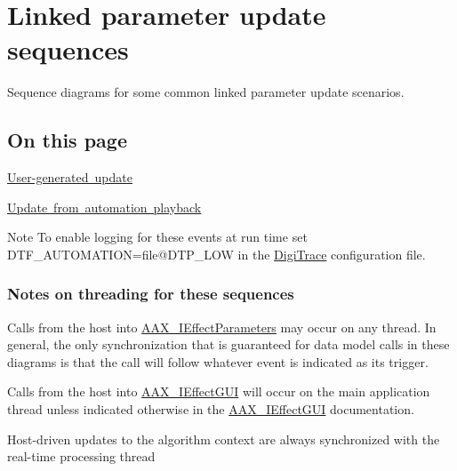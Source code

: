 \hypertarget{a00825}{}\section{Linked parameter update sequences}
\label{a00825}
Sequence diagrams for some common linked parameter update scenarios. 

\hypertarget{a00825_advancedTopics_linkedParameters_sequences_contents}{}\subsection{On this page}\label{a00825_advancedTopics_linkedParameters_sequences_contents}
\begin{DoxyItemize}
\item \mbox{\hyperlink{a00825_linkedParameters_sequences_user_gui}{User-\/generated update}} \item \mbox{\hyperlink{a00825_linkedParameters_sequences_automation}{Update from automation playback}}\end{DoxyItemize}
\begin{DoxyNote}{Note}
To enable logging for these events at run time set {\ttfamily D\+T\+F\+\_\+\+A\+U\+T\+O\+M\+A\+T\+I\+ON=file@D\+T\+P\+\_\+\+L\+OW} in the \mbox{\hyperlink{a00834}{Digi\+Trace}} configuration file.
\end{DoxyNote}
\hypertarget{a00825_advancedTopics_linkedParameters_sequences_notes}{}\subsubsection{Notes on threading for these sequences}\label{a00825_advancedTopics_linkedParameters_sequences_notes}

\begin{DoxyItemize}
\item Calls from the host into \mbox{\hyperlink{a01825}{A\+A\+X\+\_\+\+I\+Effect\+Parameters}} may occur on any thread. In general, the only synchronization that is guaranteed for data model calls in these diagrams is that the call will follow whatever event is indicated as its trigger.
\item Calls from the host into \mbox{\hyperlink{a01821}{A\+A\+X\+\_\+\+I\+Effect\+G\+UI}} will occur on the main application thread unless indicated otherwise in the \mbox{\hyperlink{a01821}{A\+A\+X\+\_\+\+I\+Effect\+G\+UI}} documentation.
\item Host-\/driven updates to the algorithm context are always synchronized with the real-\/time processing thread
\end{DoxyItemize}

